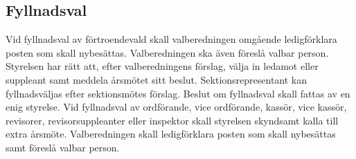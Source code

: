         \subsection{Fyllnadsval}
        \label{subsec:fyllnadsval}
                Vid fyllnadsval av förtroendevald skall valberedningen omgående ledigförklara posten som skall nybesättas. Valberedningen ska även föreslå valbar person. Styrelsen har rätt att, efter valberedningens förslag, välja in ledamot eller suppleant samt meddela årsmötet sitt beslut. Sektionsrepresentant kan fyllnadsväljas efter sektionsmötes förslag. Beslut om fyllnadsval skall fattas av en enig styrelse. Vid fyllnadsval av ordförande, vice ordförande, kassör, vice kassör, revisorer, revisorsuppleanter eller inspektor skall styrelsen skyndsamt kalla till extra årsmöte. Valberedningen skall ledigförklara posten som skall nybesättas samt föreslå valbar person.

